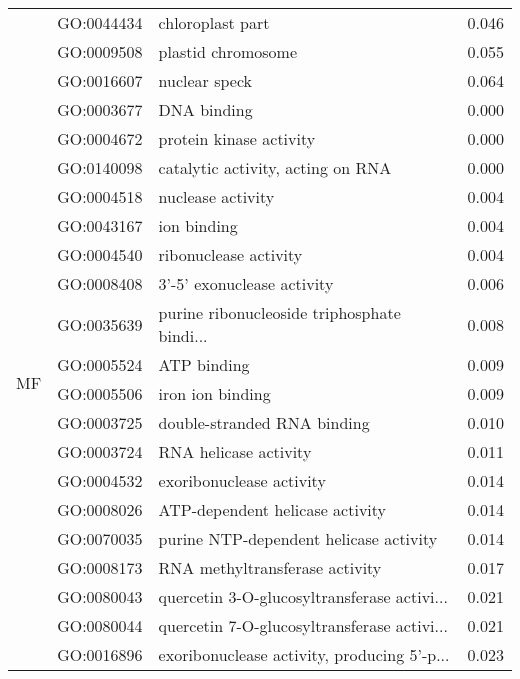 \begin{longtable}{lllr}
   & GO:0044434 &                             chloroplast part &         0.046 \\
   & GO:0009508 &                           plastid chromosome &         0.055 \\
   & GO:0016607 &                                nuclear speck &         0.064 \\
\cline{1-4}
\multirow{39}{*}{MF} & GO:0003677 &                                  DNA binding &         0.000 \\
   & GO:0004672 &                      protein kinase activity &         0.000 \\
   & GO:0140098 &            catalytic activity, acting on RNA &         0.000 \\
   & GO:0004518 &                            nuclease activity &         0.004 \\
   & GO:0043167 &                                  ion binding &         0.004 \\
   & GO:0004540 &                        ribonuclease activity &         0.004 \\
   & GO:0008408 &                   3'-5' exonuclease activity &         0.006 \\
   & GO:0035639 &  purine ribonucleoside triphosphate bindi... &         0.008 \\
   & GO:0005524 &                                  ATP binding &         0.009 \\
   & GO:0005506 &                             iron ion binding &         0.009 \\
   & GO:0003725 &                  double-stranded RNA binding &         0.010 \\
   & GO:0003724 &                        RNA helicase activity &         0.011 \\
   & GO:0004532 &                     exoribonuclease activity &         0.014 \\
   & GO:0008026 &              ATP-dependent helicase activity &         0.014 \\
   & GO:0070035 &       purine NTP-dependent helicase activity &         0.014 \\
   & GO:0008173 &               RNA methyltransferase activity &         0.017 \\
   & GO:0080043 &  quercetin 3-O-glucosyltransferase activi... &         0.021 \\
   & GO:0080044 &  quercetin 7-O-glucosyltransferase activi... &         0.021 \\
   & GO:0016896 &  exoribonuclease activity, producing 5'-p... &         0.023 \\

\end{longtable}
